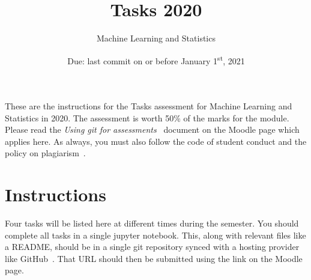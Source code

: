 \documentclass[a4paper, 12pt]{scrartcl}
\title{\vspace{-20mm}Tasks 2020}
\author{Machine Learning and Statistics}
\date{Due: last commit on or before January 1\textsuperscript{st}, 2021\vspace{-6mm}}
\begin{document}
  \maketitle

  These are the instructions for the Tasks assessment for Machine Learning and Statistics in 2020.
  The assessment is worth 50\% of the marks for the module.
  Please read the \emph{Using git for assessments}~\cite{usinggit} document on the Moodle page which applies here.
  As always, you must also follow the code of student conduct and the policy on plagiarism~\cite{gmitqaf}.

  \section*{Instructions}
    Four tasks will be listed here at different times during the semester.
    You should complete all tasks in a single jupyter notebook.
    This, along with relevant files like a README, should be in a single git repository synced with a hosting provider like GitHub~\cite{github}.
    That URL should then be submitted using the link on the Moodle page.
\end{document}
